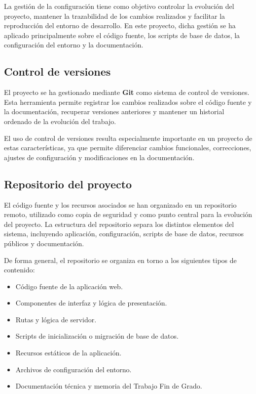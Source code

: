 La gestión de la configuración tiene como objetivo controlar la evolución del proyecto, mantener la trazabilidad de los cambios realizados y facilitar la reproducción del entorno de desarrollo. En este proyecto, dicha gestión se ha aplicado principalmente sobre el código fuente, los scripts de base de datos, la configuración del entorno y la documentación.

\subsection{Control de versiones}

El proyecto se ha gestionado mediante \textbf{Git} como sistema de control de versiones. Esta herramienta permite registrar los cambios realizados sobre el código fuente y la documentación, recuperar versiones anteriores y mantener un historial ordenado de la evolución del trabajo.

El uso de control de versiones resulta especialmente importante en un proyecto de estas características, ya que permite diferenciar cambios funcionales, correcciones, ajustes de configuración y modificaciones en la documentación.

\subsection{Repositorio del proyecto}

El código fuente y los recursos asociados se han organizado en un repositorio remoto, utilizado como copia de seguridad y como punto central para la evolución del proyecto. La estructura del repositorio separa los distintos elementos del sistema, incluyendo aplicación, configuración, scripts de base de datos, recursos públicos y documentación.

De forma general, el repositorio se organiza en torno a los siguientes tipos de contenido:

\begin{itemize}
    \item Código fuente de la aplicación web.
    \item Componentes de interfaz y lógica de presentación.
    \item Rutas y lógica de servidor.
    \item Scripts de inicialización o migración de base de datos.
    \item Recursos estáticos de la aplicación.
    \item Archivos de configuración del entorno.
    \item Documentación técnica y memoria del Trabajo Fin de Grado.
\end{itemize}

